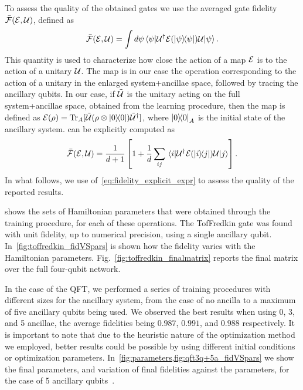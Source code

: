 To assess the quality of the obtained gates we use the averaged gate fidelity $\bar{{\mathcal{F}}}({\mathcal{E}},{\mathcal{U}})$, defined as
\begin{equation}
	\bar{{\mathcal{F}}}({\mathcal{E}}, {\mathcal{U}}) =
	\int d\psi \mel{\psi}{{\mathcal{U}}^\dagger {\mathcal{E}}(\ketbra\psi){\mathcal{U}}}{\psi}.
	\label{eq:fidelity_definition}
\end{equation}
This quantity is used to characterize how close the action of a map ${\mathcal{E}}$ is to the action of a unitary ${\mathcal{U}}$.
The map is in our case the operation corresponding to the action of a unitary in the enlarged system+ancillae space, followed by tracing the ancillary qubits.
In our case, if $\tilde{{\mathcal{U}}}$ is the unitary acting on the full system+ancillae space, obtained from the learning procedure, then the map is defined as
${{\mathcal{E}}(\rho) = \Tr_A[\tilde{{\mathcal{U}}}(\rho\otimes\ketbra{0}) \tilde{{\mathcal{U}}}^\dagger]}$,
where $\ketbra{0}_A$ is the initial state of the ancillary system.
 can be explicitly computed as
\begin{equation}
	\bar{{\mathcal{F}}}({\mathcal{E}},{\mathcal{U}}) = \frac{1}{d+1} \left[
		1 + \frac{1}{d}\sum_{ij}\mel{i}{{\mathcal{U}}^\dagger {\mathcal{E}}(\ketbra{i}{j}){\mathcal{U}}}{j}
	\right].
	\label{eq:fidelity_explicit_expr}
\end{equation}
In what follows, we use of~\cref{eq:fidelity_explicit_expr} to assess the quality of the reported results.

 shows the sets of Hamiltonian parameters that were obtained through the training procedure, for each of these operations.
The TofFredkin gate was found with unit fidelity, up to numerical precision, using a single ancillary qubit. In~\cref{fig:toffredkin_fidVSpars} is shown how the fidelity varies with the Hamiltonian parameters. Fig.~\ref{fig:toffredkin_finalmatrix} reports the final matrix over the full four-qubit network.

In the case of the \ac{QFT}, we performed a series of training procedures with different sizes for the ancillary system, from the case of no ancilla to a maximum of five ancillary qubits being used.
We observed the best results when using 0, 3, and 5 ancillae, the average fidelities being $0.987$, $0.991$, and $0.988$ respectively.
It is important to note that due to the heuristic nature of the optimization method we employed, better results could be possible by using different initial conditions or  optimization parameters.
In~\cref{fig:parameters,fig:qft3q+5a_fidVSpars} we show the final parameters, and variation of final fidelities against the parameters, for the case of 5 ancillary qubits~\cite{seeRepoForQFTDetails}.

